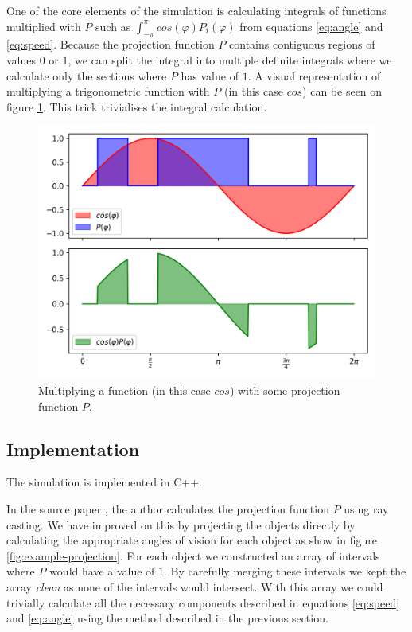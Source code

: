 \documentclass[9pt]{pnas-new}
\begin{document}
One of the core elements of the simulation is calculating integrals of functions multiplied with $P$ such as $\int_{-\pi}^{\pi} cos(\varphi) P_i(\varphi)$ from equations \ref{eq:angle} and \ref{eq:speed}.
Because the projection function $P$ contains contiguous regions of values $0$ or $1$, we can split the integral into multiple definite integrals where we calculate only the sections where $P$ has value of $1$.
A visual representation of multiplying a trigonometric function with $P$ (in this case $cos$) can be seen on figure \ref{fig:integral}.
This trick trivialises the integral calculation.

\begin{figure}[h]
    \centering
    \includegraphics[width=\linewidth]{integral.png}
    \caption{
      Multiplying a function (in this case $cos$) with some projection function $P$.
    }
    \label{fig:integral}
\end{figure}




\subsection{Implementation}

The simulation is implemented in C++.

In the source paper \cite{main-paper}, the author calculates the projection function $P$ using ray casting.
We have improved on this by projecting the objects directly by calculating the appropriate angles of vision for each object as show in figure \ref{fig:example-projection}.
For each object we constructed an array of intervals where $P$ would have a value of $1$.
By carefully merging these intervals we kept the array \textit{clean} as none of the intervals would intersect.
With this array we could trivially calculate all the necessary components described in equations \ref{eq:speed} and \ref{eq:angle} using the method described in the previous section.
\end{document}
